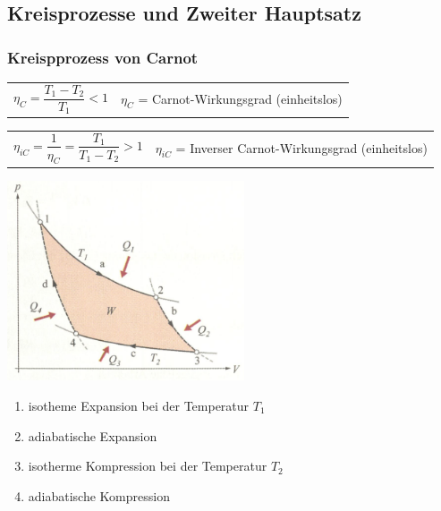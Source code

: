 	\vspace{2cm}
	\subsection{Kreisprozesse und Zweiter Hauptsatz}
		\subsubsection{Kreispprozess von Carnot}
			\begin{minipage}[t]{13cm}
					\renewcommand{\arraystretch}{2.5}
					\begin{tabular}{ p{5cm} | p{9cm}}
						$\eta_C = \dfrac{T_1 - T_2}{T_1} < 1$	&	$\eta_C$ = Carnot-Wirkungsgrad (einheitslos)\\
					\end{tabular}
					\renewcommand{\arraystretch}{1}
					\newline
					\newline
					\renewcommand{\arraystretch}{2.5}
					\begin{tabular}{ p{5cm} | p{9cm}}
						$\eta_{iC} = \dfrac{1}{\eta_C} = \dfrac{T_1}{T_1 - T_2} > 1$	&	$\eta_{iC}$ = Inverser Carnot-Wirkungsgrad (einheitslos)\\
					\end{tabular}
					\renewcommand{\arraystretch}{1}
			\end{minipage}
			\newline
			\newline
			\newline
			\newline
			\begin{minipage}[t]{7cm}
				\vspace{-\ht\strutbox}\includegraphics[width=7cm]{./bilder/KreisprozessCarnot.png}
			\end{minipage}
			\begin{minipage}[t]{10cm}
				\begin{enumerate}
					\vspace{1cm}
					\item isotheme Expansion bei der Temperatur $T_1$
					\item adiabatische Expansion
					\item isotherme Kompression bei der Temperatur $T_2$
					\item adiabatische Kompression
				\end{enumerate}
			\end{minipage}
		
